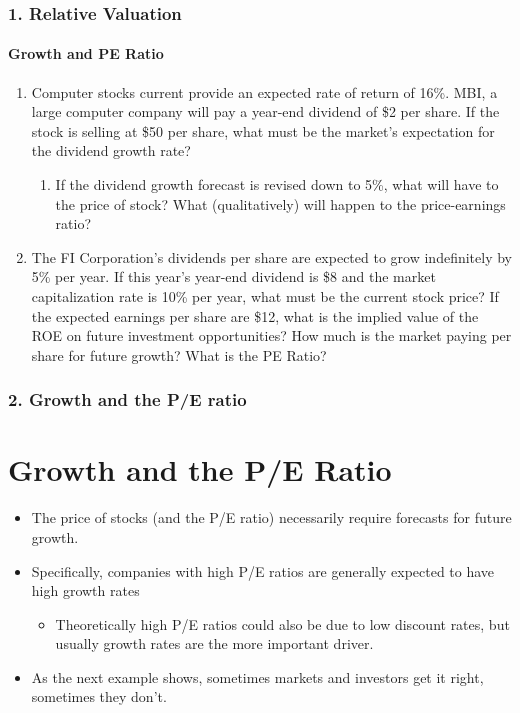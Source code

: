 \documentclass{beamer}
\begin{document}
\begin{practiceframe}[t]
\frametitle{1. Relative Valuation}
\framesubtitle{Growth and PE Ratio}

    \begin{enumerate}
        \item Computer stocks current provide an expected rate of return 
        of 16\%.   MBI, a large computer company will pay a year-end dividend of \$2 
        per share.   If the stock is selling at \$50 per share, what must be the market's 
        expectation for the dividend growth rate?
        \begin{enumerate}
        \item[a. ] If the dividend growth forecast is revised down to 5\%, what will have to the price of stock?  What (qualitatively) will happen to the price-earnings ratio?
        \end{enumerate}
        \item The FI Corporation's dividends per share are expected to 
        grow indefinitely by 5\% per year.  If this year's year-end dividend is \$8 and the market capitalization rate is 10\% per year, what must be the current stock price? If the expected earnings per share are \$12, what is the implied value of the ROE on future investment opportunities?   How much is the market paying per share for future growth?  What is the PE Ratio?
    \end{enumerate}

\end{practiceframe}

\begin{frame}[t]
    \frametitle{2. Growth and the P/E ratio}
    \section{Growth and the P/E Ratio}

    \begin{itemize}
        \item The price of stocks (and the P/E ratio) necessarily require forecasts for future growth.
        \item Specifically, companies with high P/E ratios are generally expected to have high growth rates
        \begin{itemize} 
            \item Theoretically high P/E ratios could also be due to low discount rates, but usually growth rates are the more important driver.
        \end{itemize}
        \item As the next example shows, sometimes markets and investors get it right, sometimes they don't.
    \end{itemize}

\end{frame}
\end{document}

